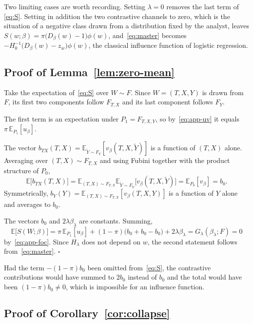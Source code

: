 \documentclass[11pt]{article}
\theoremstyle{plain}
\theoremstyle{definition}
\theoremstyle{remark}
\newcommand{\pE}{\ensuremath{\mathbb{E}}}
\newcommand{\ratio}{\ensuremath{\pi}}
\newcommand{\score}{S}
\begin{document}
Two limiting cases are worth recording. Setting $\lambda = 0$ removes the last term of
\eqref{eq:S}. Setting in addition the two contrastive channels to zero, which is the
situation of a negative class drawn from a distribution fixed by the analyst, leaves
$\score(w;\beta) = \ratio\big(D_\beta(w)-1\big)\phi(w)$, and~\eqref{eq:master} becomes
$-H_0^{-1}\big(D_\beta(w) - z_w\big)\phi(w)$, the classical influence function of
logistic regression.

\subsection{Proof of Lemma~\ref{lem:zero-mean}}
\label{app:logistic-zero-mean}

Take the expectation of~\eqref{eq:S} over $W \sim F$. Since $W = (T,X,Y)$ is drawn from
$F$, its first two components follow $F_{T,X}$ and its last component follows $F_Y$.

The first term is an expectation under $P_1 = F_{T,X,Y}$, so by~\eqref{eq:app-uv} it
equals $\ratio\,\pE_{P_1}[u_\beta]$.

The vector $b_{TX}(T,X) = \pE_{\widetilde Y \sim F_Y}[v_\beta(T,X,\widetilde Y)]$ is a
function of $(T,X)$ alone. Averaging over $(T,X) \sim F_{T,X}$ and using Fubini together
with the product structure of $P_0$,
\[
\pE\big[ b_{TX}(T,X) \big]
= \pE_{(T,X) \sim F_{T,X}} \pE_{\widetilde Y \sim F_Y}\big[ v_\beta(T,X,\widetilde Y) \big]
= \pE_{P_0}[v_\beta] = b_0 .
\]
Symmetrically, $b_Y(Y) = \pE_{(T,X) \sim F_{T,X}}[v_\beta(T,X,Y)]$ is a function of $Y$
alone and averages to $b_0$.

The vectors $b_0$ and $2\lambda\beta_\lambda$ are constants. Summing,
\[
\pE\big[ \score(W;\beta) \big]
= \ratio\,\pE_{P_1}[u_\beta] + (1-\ratio)\big( b_0 + b_0 - b_0 \big) + 2\lambda\beta_\lambda
= G_\lambda(\beta_\lambda;F) = 0
\]
by~\eqref{eq:app-foc}. Since $H_\lambda$ does not depend on $w$, the second statement
follows from~\eqref{eq:master}. \hfill$\square$

Had the term $-(1-\ratio)b_0$ been omitted from~\eqref{eq:S}, the contrastive
contributions would have summed to $2b_0$ instead of $b_0$ and the total would have been
$(1-\ratio)b_0 \neq 0$, which is impossible for an influence function.

\subsection{Proof of Corollary~\ref{cor:collapse}}
\label{app:logistic-collapse}
\end{document}
